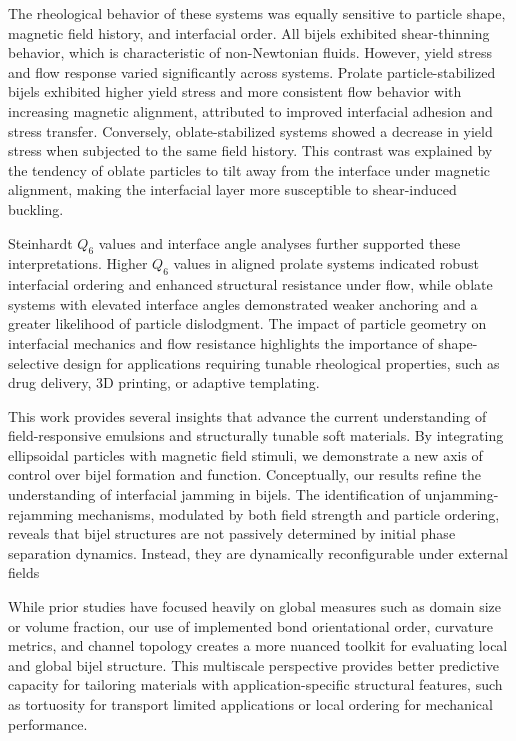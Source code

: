 The rheological behavior of these systems was equally sensitive to particle shape, magnetic field history, and interfacial order. All 
bijels exhibited shear-thinning behavior, which is characteristic of non-Newtonian fluids. However, yield stress and flow 
response varied significantly across systems. Prolate particle-stabilized bijels exhibited higher yield stress and more consistent flow 
behavior with increasing magnetic alignment, attributed to improved interfacial adhesion and stress transfer. Conversely, oblate-stabilized 
systems showed a decrease in yield stress when subjected to the same field history. This contrast was explained by the tendency of oblate 
particles to tilt away from the interface under magnetic alignment, making the interfacial layer more susceptible to shear-induced buckling.

Steinhardt $Q_6$ values and interface angle analyses further supported these interpretations. Higher $Q_6$ values in aligned prolate systems 
indicated robust interfacial ordering and enhanced structural resistance under flow, while oblate systems with elevated interface angles 
demonstrated weaker anchoring and a greater likelihood of particle dislodgment. The impact of particle geometry on interfacial mechanics 
and flow resistance highlights the importance of shape-selective design for applications requiring tunable rheological properties, such as 
drug delivery, 3D printing, or adaptive templating.

This work provides several insights that advance the current understanding of field-responsive emulsions and structurally 
tunable soft materials. By integrating ellipsoidal particles with magnetic field stimuli, we demonstrate a new axis of control over 
bijel formation and function. Conceptually, our results refine the understanding of interfacial jamming in bijels. The identification of
unjamming-rejamming mechanisms, modulated by both field strength and particle ordering, reveals that bijel structures are not passively 
determined by initial phase separation dynamics. Instead, they are dynamically reconfigurable under external fields

While prior studies have focused heavily on global measures such as domain size or volume fraction, our use of implemented bond orientational order, 
curvature metrics, and channel topology creates a more nuanced toolkit for evaluating local and global bijel structure. This multiscale 
perspective provides better predictive capacity for tailoring materials with application-specific structural features, such as tortuosity 
for transport limited applications or local ordering for mechanical performance.

